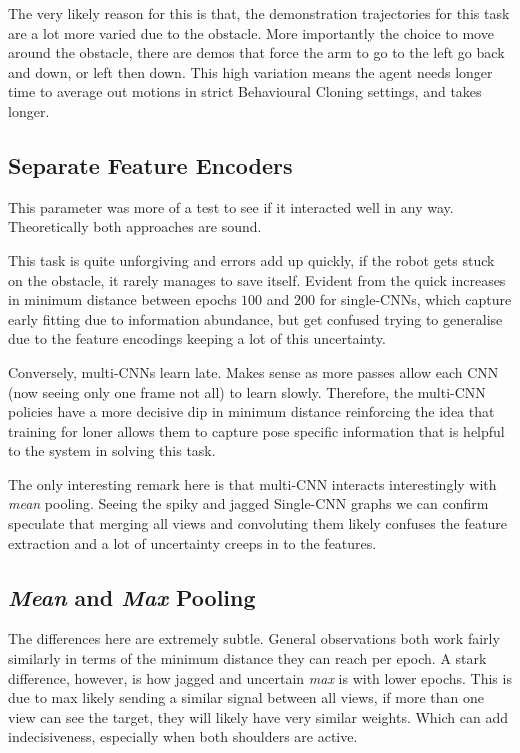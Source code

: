 The very likely reason for this is that, the demonstration trajectories for this task are a lot more varied due to the obstacle. More importantly the choice to move around the obstacle, there are demos that force the arm to go to the left go back and down, or left then down. This high variation means the agent needs longer time to average out motions in strict Behavioural Cloning settings, and takes longer.


\subsection{Separate Feature Encoders}
This parameter was more of a test to see if it interacted well in any way. Theoretically both approaches are sound. 

This task is quite unforgiving and errors add up quickly, if the robot gets stuck on the obstacle, it rarely manages to save itself. Evident from the quick increases in minimum distance between epochs $100$ and $200$ for single-CNNs, which capture early fitting due to information abundance, but get confused trying to generalise due to the feature encodings keeping a lot of this uncertainty.

Conversely, multi-CNNs learn late. Makes sense as more passes allow each CNN (now seeing only one frame not all) to learn slowly. Therefore, the multi-CNN policies have a more decisive dip in minimum distance reinforcing the idea that training for loner allows them to capture pose specific information that is helpful to the system in solving this task.

The only interesting remark here is that multi-CNN interacts interestingly with \emph{mean} pooling. Seeing the spiky and jagged Single-CNN graphs we can confirm speculate that merging all views and convoluting them likely confuses the feature extraction and a lot of uncertainty creeps in to the features.


\subsection{\emph{Mean} and \emph{Max} Pooling}
The differences here are extremely subtle. General observations both work fairly similarly in terms of the minimum distance they can reach per epoch. A stark difference, however, is how jagged and uncertain \emph{max} is with lower epochs. This is due to max likely sending a similar signal between all views, if more than one view can see the target, they will likely have very similar weights. Which can add indecisiveness, especially when both shoulders are active.


